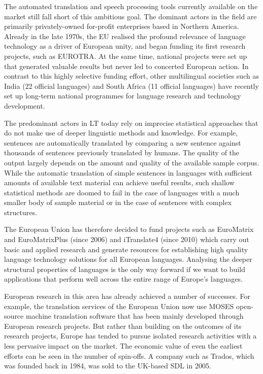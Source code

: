 \begin{multicols}{2}
The automated translation and speech processing tools currently available on the market still fall short of this ambitious goal. The dominant actors in the field are primarily privately-owned for-profit enterprises based in Northern America. Already in the late 1970s, the EU realised the profound relevance of language technology as a driver of European unity, and began funding its first research projects, such as EUROTRA. At the same time, national projects were set up that generated valuable results but never led to concerted European action. In contrast to this highly selective funding effort, other multilingual societies such as India (22 official languages) and South Africa (11 official languages) have recently set up long-term national programmes for language research and technology development. 

    The predominant actors in LT today rely on imprecise statistical approaches that do not make use of deeper linguistic methods and knowledge. For example, sentences are automatically translated by comparing a new sentence against thousands of sentences previously translated by humans. The quality of the output largely depends on the amount and quality of the available sample corpus. While the automatic translation of simple sentences in languages with sufficient amounts of available text material can achieve useful results, such shallow statistical methods are doomed to fail in the case of languages with a much smaller body of sample material or in the case of sentences with complex structures.

   The European Union has therefore decided to fund projects such as EuroMatrix and EuroMatrixPlus (since 2006) and iTranslate4 (since 2010) which carry out basic and applied research and generate resources for establishing high quality language technology solutions for all European languages. Analysing the deeper structural properties of languages is the only way forward if we want to build applications that perform well across the entire range of Europe’s languages.

    European research in this area has already achieved a number of successes. For example, the translation services of the European Union now use MOSES open-source machine translation software that has been mainly developed through European research projects. But rather than building on the outcomes of its research projects, Europe has tended to pursue isolated research activities with a less pervasive impact on the market.  The economic value of even the earliest efforts can be seen in the number of spin-offs. A company such as Trados, which was founded back in 1984, was sold to the UK-based SDL in 2005.


\end{multicols}
